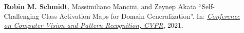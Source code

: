 \begin{publications}
\newcommand{\JourConfTitle}[1]{\ul{\emph{#1}}}







\begin{conferences}
\item \textbf{Robin M. Schmidt}, Massimiliano Mancini, and Zeynep Akata ``Self-Challenging Class Activation Maps for Domain Generalization''. In: \JourConfTitle{Conference on Computer Vision and Pattern Recognition, {CVPR}}, 2021.
\end{conferences}

\end{publications}